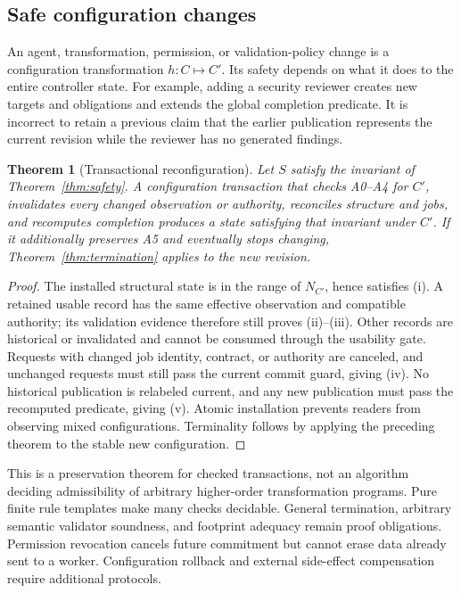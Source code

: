 \documentclass[pdflatex,sn-mathphys-num]{sn-jnl}
\theoremstyle{thmstyleone}
\newtheorem{theorem}{Theorem}
\theoremstyle{thmstylethree}
\theoremstyle{thmstyletwo}
\begin{document}
\subsection{Safe configuration changes}
An agent, transformation, permission, or validation-policy change is a configuration transformation $h:C\mapsto C'$. Its safety depends on what it does to the entire controller state. For example, adding a security reviewer creates new targets and obligations and extends the global completion predicate. It is incorrect to retain a previous claim that the earlier publication represents the current revision while the reviewer has no generated findings.

\begin{theorem}[Transactional reconfiguration]\label{thm:reconfig}
Let $S$ satisfy the invariant of Theorem~\ref{thm:safety}. A configuration transaction that checks A0--A4 for $C'$, invalidates every changed observation or authority, reconciles structure and jobs, and recomputes completion produces a state satisfying that invariant under $C'$. If it additionally preserves A5 and eventually stops changing, Theorem~\ref{thm:termination} applies to the new revision.
\end{theorem}
\begin{proof}
The installed structural state is in the range of $N_{C'}$, hence satisfies (i). A retained usable record has the same effective observation and compatible authority; its validation evidence therefore still proves (ii)--(iii). Other records are historical or invalidated and cannot be consumed through the usability gate. Requests with changed job identity, contract, or authority are canceled, and unchanged requests must still pass the current commit guard, giving (iv). No historical publication is relabeled current, and any new publication must pass the recomputed predicate, giving (v). Atomic installation prevents readers from observing mixed configurations. Terminality follows by applying the preceding theorem to the stable new configuration.\qedhere
\end{proof}

This is a preservation theorem for checked transactions, not an algorithm deciding admissibility of arbitrary higher-order transformation programs. Pure finite rule templates make many checks decidable. General termination, arbitrary semantic validator soundness, and footprint adequacy remain proof obligations. Permission revocation cancels future commitment but cannot erase data already sent to a worker. Configuration rollback and external side-effect compensation require additional protocols.
\end{document}
